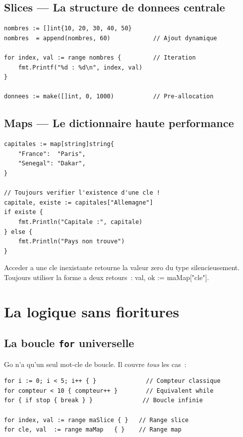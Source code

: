 \documentclass[11pt,a4paper,openany]{book}
\newcommand{\code}[1]{%
  \colorbox{GoLightGrey}{\small\ttfamily\color{GoDark}#1}}
\begin{document}
\section{Slices --- La structure de donnees centrale}

\begin{lstlisting}[style=goStyle]
nombres := []int{10, 20, 30, 40, 50}
nombres  = append(nombres, 60)            // Ajout dynamique

for index, val := range nombres {         // Iteration
    fmt.Printf("%d : %d\n", index, val)
}

donnees := make([]int, 0, 1000)           // Pre-allocation
\end{lstlisting}

\section{Maps --- Le dictionnaire haute performance}

\begin{lstlisting}[style=goStyle]
capitales := map[string]string{
    "France":  "Paris",
    "Senegal": "Dakar",
}

// Toujours verifier l'existence d'une cle !
capitale, existe := capitales["Allemagne"]
if existe {
    fmt.Println("Capitale :", capitale)
} else {
    fmt.Println("Pays non trouve")
}
\end{lstlisting}

\begin{boiteAttention}
Acceder a une cle inexistante retourne la valeur zero du type silencieusement.
Toujours utiliser la forme a deux retours~: \code{val, ok := maMap["cle"]}.
\end{boiteAttention}

\chapter{La logique sans fioritures}

\section{La boucle \texttt{for} universelle}

Go n'a qu'un seul mot-cle de boucle. Il couvre \textit{tous} les cas~:

\begin{lstlisting}[style=goStyle]
for i := 0; i < 5; i++ { }              // Compteur classique
for compteur < 10 { compteur++ }        // Equivalent while
for { if stop { break } }              // Boucle infinie

for index, val := range maSlice { }   // Range slice
for cle, val  := range maMap   { }    // Range map
\end{lstlisting}
\end{document}
